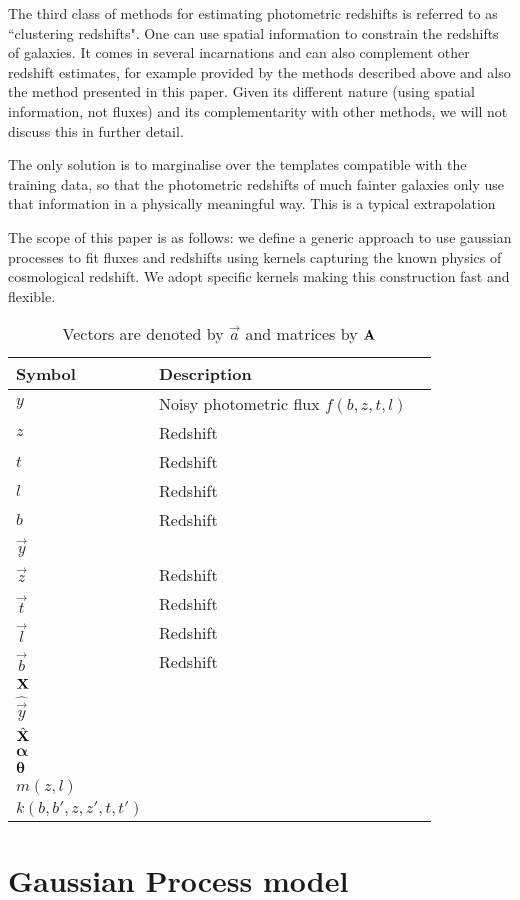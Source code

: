\documentclass[aps,prd,showpacs,superscriptaddress,groupedaddress]{revtex4}  %
\begin{document}
The third class of methods for estimating photometric redshifts is referred to as ``clustering redshifts". 
One can use spatial information to constrain the redshifts of galaxies.
It comes in several incarnations and can also complement other redshift estimates, for example provided by the methods described above and also the method presented in this paper.
Given its different nature (using spatial information, not fluxes) and its complementarity with other methods, we will not discuss this in further detail.

The only solution is to marginalise over the templates compatible with the training data, so that the photometric redshifts of much fainter galaxies only use that information in a physically meaningful way. 
This is a typical extrapolation 

The scope of this paper is as follows: we define a generic approach to use gaussian processes to fit fluxes and redshifts using kernels capturing the known physics of cosmological redshift.
We adopt specific kernels making this construction fast and flexible.

\begin{table}
\begin{tabular}{lll}
Symbol 	 & Description\\\hline
$y$ & Noisy photometric flux $f(b,z,t,l)$\\
$z$ & Redshift \\
$t$ & Redshift \\
$l$ & Redshift \\
$b$ & Redshift \\\hline
$\vec{y}$		&	\\
$\vec{z}$ & Redshift \\
$\vec{t}$ & Redshift \\
$\vec{l}$ & Redshift \\
$\vec{b}$ & Redshift \\
$\mat{X}$\\\hline
$\hat{\vec{y}}$		&	\\
$\hat{\mat{X}}$\\
$\bm{\alpha}$\\
$\bm{\theta}$\\\hline
$m(z,l)$ \\
$k(b,b',z,z',t,t')$
\end{tabular}
\caption{Vectors are denoted by $\vec{a}$ and matrices by $\mat{A}$}
\end{table}

\section{Gaussian Process model}
\end{document}

